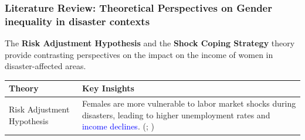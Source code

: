 \documentclass[serif, aspectratio=169]{beamer}
\begin{document}
\begin{frame}[label=literature_review2]
\frametitle{Literature Review: Theoretical Perspectives on Gender inequality in disaster contexts}







The \textbf{Risk Adjustment Hypothesis} and the \textbf{Shock Coping Strategy} theory provide contrasting perspectives on the impact on the income of women in disaster-affected areas.

\vspace{0.2cm}

    \begin{table}[ht]
        \centering
        \begin{tabular}{>{\raggedright}p{3cm} p{10cm}}
            \hline
            \textbf{Theory} & \textbf{Key Insights} \\
            \hline

\addlinespace

            Risk Adjustment Hypothesis & Females are more vulnerable to labor market shocks during disasters, leading to higher unemployment rates and \textcolor{blue}{income declines}. (\citealt{Kim2014ARetention}; \citealt{Groger2016InternalTyphoon})\\


\end{tabular}
\end{table}
\end{frame}
\end{document}

